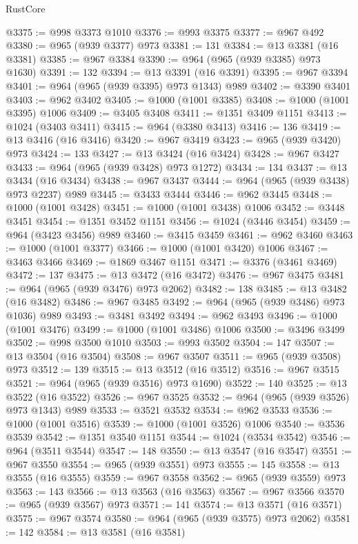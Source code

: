 \begin{lexlean}{RustCore}
\begin{coremodule}
@3375 := @998 @3373 @1010
@3376 := @993 @3375
@3377 := @967 @492
@3380 := @965 (@939 @3377) @973
@3381 := 131
@3384 := @13 @3381 (@16 @3381)
@3385 := @967 @3384
@3390 := @964 (@965 (@939 @3385) @973 @1630)
@3391 := 132
@3394 := @13 @3391 (@16 @3391)
@3395 := @967 @3394
@3401 := @964 (@965 (@939 @3395) @973 @1343) @989
@3402 := @3390 @3401
@3403 := @962 @3402
@3405 := @1000 (@1001 @3385)
@3408 := @1000 (@1001 @3395) @1006
@3409 := @3405 @3408
@3411 := @1351 @3409 @1151
@3413 := @1024 (@3403 @3411)
@3415 := @964 (@3380 @3413)
@3416 := 136
@3419 := @13 @3416 (@16 @3416)
@3420 := @967 @3419
@3423 := @965 (@939 @3420) @973
@3424 := 133
@3427 := @13 @3424 (@16 @3424)
@3428 := @967 @3427
@3433 := @964 (@965 (@939 @3428) @973 @1272)
@3434 := 134
@3437 := @13 @3434 (@16 @3434)
@3438 := @967 @3437
@3444 := @964 (@965 (@939 @3438) @973 @2237) @989
@3445 := @3433 @3444
@3446 := @962 @3445
@3448 := @1000 (@1001 @3428)
@3451 := @1000 (@1001 @3438) @1006
@3452 := @3448 @3451
@3454 := @1351 @3452 @1151
@3456 := @1024 (@3446 @3454)
@3459 := @964 (@3423 @3456) @989
@3460 := @3415 @3459
@3461 := @962 @3460
@3463 := @1000 (@1001 @3377)
@3466 := @1000 (@1001 @3420) @1006
@3467 := @3463 @3466
@3469 := @1869 @3467 @1151
@3471 := @3376 (@3461 @3469)
@3472 := 137
@3475 := @13 @3472 (@16 @3472)
@3476 := @967 @3475
@3481 := @964 (@965 (@939 @3476) @973 @2062)
@3482 := 138
@3485 := @13 @3482 (@16 @3482)
@3486 := @967 @3485
@3492 := @964 (@965 (@939 @3486) @973 @1036) @989
@3493 := @3481 @3492
@3494 := @962 @3493
@3496 := @1000 (@1001 @3476)
@3499 := @1000 (@1001 @3486) @1006
@3500 := @3496 @3499
@3502 := @998 @3500 @1010
@3503 := @993 @3502
@3504 := 147
@3507 := @13 @3504 (@16 @3504)
@3508 := @967 @3507
@3511 := @965 (@939 @3508) @973
@3512 := 139
@3515 := @13 @3512 (@16 @3512)
@3516 := @967 @3515
@3521 := @964 (@965 (@939 @3516) @973 @1690)
@3522 := 140
@3525 := @13 @3522 (@16 @3522)
@3526 := @967 @3525
@3532 := @964 (@965 (@939 @3526) @973 @1343) @989
@3533 := @3521 @3532
@3534 := @962 @3533
@3536 := @1000 (@1001 @3516)
@3539 := @1000 (@1001 @3526) @1006
@3540 := @3536 @3539
@3542 := @1351 @3540 @1151
@3544 := @1024 (@3534 @3542)
@3546 := @964 (@3511 @3544)
@3547 := 148
@3550 := @13 @3547 (@16 @3547)
@3551 := @967 @3550
@3554 := @965 (@939 @3551) @973
@3555 := 145
@3558 := @13 @3555 (@16 @3555)
@3559 := @967 @3558
@3562 := @965 (@939 @3559) @973
@3563 := 143
@3566 := @13 @3563 (@16 @3563)
@3567 := @967 @3566
@3570 := @965 (@939 @3567) @973
@3571 := 141
@3574 := @13 @3571 (@16 @3571)
@3575 := @967 @3574
@3580 := @964 (@965 (@939 @3575) @973 @2062)
@3581 := 142
@3584 := @13 @3581 (@16 @3581)

\end{coremodule}
\end{lexlean}
